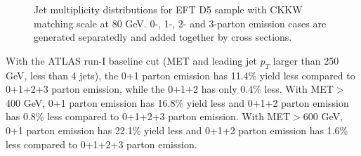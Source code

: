 \begin{figure}[h!]
	\centering  
	\hfill
	\hfill
	\caption{Jet multiplicity distributions for EFT D5 sample with CKKW matching scale at 80 GeV. 0-, 1-, 2- and 3-parton 
		emission cases are generated separatedly and added together by cross sections.}
	\label{fig:RatioKine_D5_2}
\end{figure}

With the ATLAS run-I baseline cut (MET and leading jet $p_{T}$ larger than 250 GeV, less than 4 jets), the 0+1 parton emission has 11.4\% yield less compared to 0+1+2+3 parton emission, while the 0+1+2 has only 0.4\% less. With MET$>$400 GeV, 0+1 parton emission has 16.8\% yield less and 0+1+2 parton emission has 0.8\% less compared to 0+1+2+3 parton emission. With MET$>$600 GeV, 0+1 parton emission has 22.1\% yield less and 0+1+2 parton emission has 1.6\% less compared to 0+1+2+3 parton emission.
